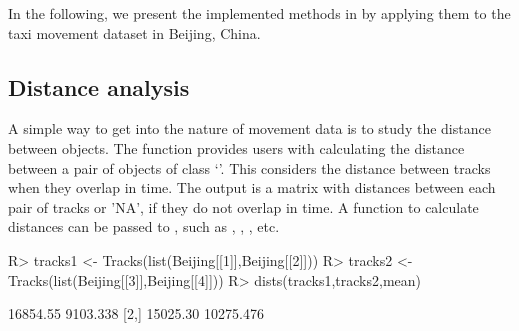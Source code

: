 \documentclass[article]{jss}
\newcommand{\class}[1]{`\code{#1}'}
\begin{document}
  In the following, we present the implemented methods in  by applying them to the taxi movement dataset in Beijing, China. 
\subsection{Distance analysis}\label{distanal}
  A simple way to get into the nature of movement data is to study the distance between objects. The function  provides users with calculating the distance between a pair of objects of class \class{Tracks}. This considers the distance between tracks when they overlap in time. The output is a matrix with distances between each pair of tracks or 'NA', if they do not overlap in time. A function to calculate distances can be passed to , such as , , , etc.

\begin{Schunk}
\begin{Sinput}
R>  tracks1 <- Tracks(list(Beijing[[1]],Beijing[[2]]))
R>  tracks2 <- Tracks(list(Beijing[[3]],Beijing[[4]]))
R>  dists(tracks1,tracks2,mean)
\end{Sinput}
\begin{Soutput}
         [,1]      [,2]
[1,] 16854.55  9103.338
[2,] 15025.30 10275.476
\end{Soutput}
\end{Schunk}
\end{document}

